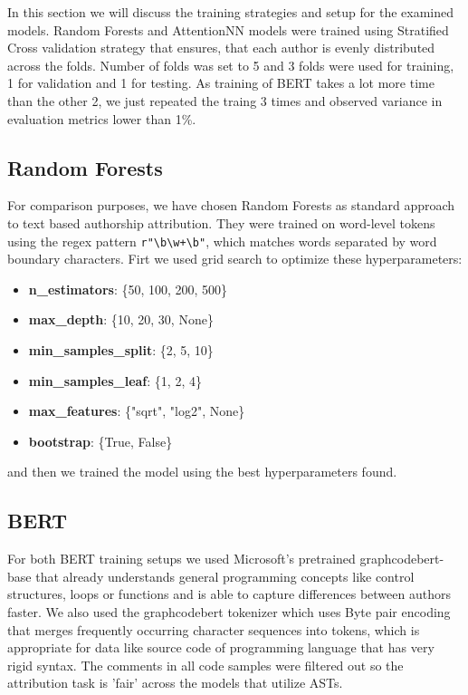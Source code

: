 \documentclass[conference]{IEEEtran}
\begin{document}
In this section we will discuss the training strategies and setup for the examined models.
Random Forests and AttentionNN models were trained using Stratified Cross validation strategy that ensures, that each author is evenly distributed
across the folds. Number of folds was set to 5 and 3 folds were used for training, 1 for validation and 1 for testing.
As training of BERT takes a lot more time than the other 2, we just repeated the traing 3 times and 
observed variance in evaluation metrics lower than 1\%.

\subsection{Random Forests}

For comparison purposes, we have chosen Random Forests as standard approach to text based authorship attribution. 
They were trained on word-level tokens using the regex pattern \verb|r"\b\w+\b"|, which matches words separated by word boundary characters.
Firt we used grid search to optimize these hyperparameters:
\begin{itemize}
    \item \textbf{n\_estimators}: \{50, 100, 200, 500\}
    \item \textbf{max\_depth}: \{10, 20, 30, None\}
    \item \textbf{min\_samples\_split}: \{2, 5, 10\}
    \item \textbf{min\_samples\_leaf}: \{1, 2, 4\}
    \item \textbf{max\_features}: \{"sqrt", "log2", None\}
    \item \textbf{bootstrap}: \{True, False\}
\end{itemize}

and then we trained the model using the best hyperparameters found.

\subsection{BERT}

For both BERT training setups we used Microsoft's pretrained graphcodebert-base \cite{codebert} that already understands general programming concepts like 
control structures, loops or functions and is able to capture differences between authors faster. We also used the graphcodebert tokenizer which uses 
Byte pair encoding that merges frequently occurring character sequences into tokens, which is appropriate for data like source code of programming language
that has very rigid syntax. The comments in all code samples were filtered out so the attribution task
is 'fair' across the models that utilize ASTs.
\end{document}

